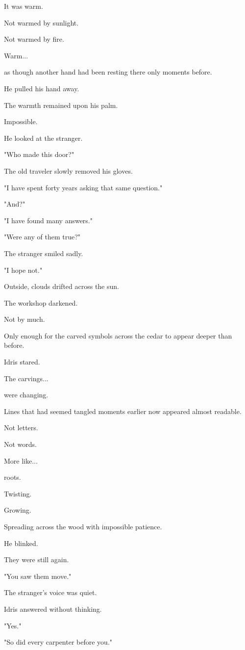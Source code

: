 \documentclass[12pt,openany]{book}
\begin{document}
It was warm.

Not warmed by sunlight.

Not warmed by fire.

Warm...

as though another hand had been resting there only moments before.

He pulled his hand away.

The warmth remained upon his palm.

Impossible.

He looked at the stranger.

"Who made this door?"

The old traveler slowly removed his gloves.

"I have spent forty years asking that same question."

"And?"

"I have found many answers."

"Were any of them true?"

The stranger smiled sadly.

"I hope not."

Outside, clouds drifted across the sun.

The workshop darkened.

Not by much.

Only enough for the carved symbols across the cedar to appear deeper than before.

Idris stared.

The carvings...

were changing.

Lines that had seemed tangled moments earlier now appeared almost readable.

Not letters.

Not words.

More like...

roots.

Twisting.

Growing.

Spreading across the wood with impossible patience.

He blinked.

They were still again.

"You saw them move."

The stranger's voice was quiet.

Idris answered without thinking.

"Yes."

"So did every carpenter before you."
\end{document}
